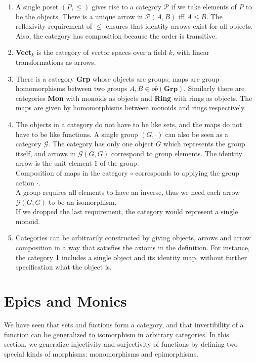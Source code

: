 \begin {enumerate}
  \item A single poset $(P, \leq)$ gives rise to a category $\mathscr{P}$ if we take elements of $P$ to be the objects. There is a unique arrow in $\mathscr{P}(A, B)$ iff $A \leq B$. The reflexivity requirement of $\leq$ ensures that identity arrows exist for all objects. Also, the category has composition because the order is transitive.

  
  \item \textbf{Vect$_k$} is the category of vector spaces over a field $k$, with linear transformations as arrows.
  
  \item There is a category \textbf{Grp} whose objects are groups; maps are group homomorphisms between two groups $A,B \in ob(\textbf{Grp}).$
    Similarly there are categories \textbf{Mon} with monoids as objects and \textbf{Ring} with rings as objects.
    The maps are given by homomorphisms between monoids and rings respectively.
  
  \item
    The objects in a category do not have to be like sets, and the maps do not have to be like functions.
    A single group $(G, \cdot)$ can also be seen as a category $\mathcal{G}$. The category has only one object $G$ which represents the group itself,
    and arrows in $\mathcal{G}(G, G)$  correspond to group elements.
    The identity arrow is the unit element $1$ of the group.\\
    Composition of maps in the category $\circ$ corresponds to applying the group action $\cdot$.\\
    A group requires all elements to have an inverse, thus we need each arrow $\mathcal{G}(G, G)$ to be an isomorphism.\\
    If we dropped the last requirement, the category would represent a single monoid.
  

  \item Categories can be arbitrarily constructed by giving objects, arrows and arrow composition in a way that satisfies the axioms in the definition. For instance, the category \textbf{1} includes a single object and its identity map, without further specification what the object is. \\

 \end {enumerate}


\section {Epics and Monics}
We have seen that sets and fuctions form a category, and that invertibility of a function can be generalized to isomorphism in arbitrary categories. In this section, we generalize injectivity and surjectivity of functions by defining two special kinds of morphisms: monomorphisms and epimorphisms.


